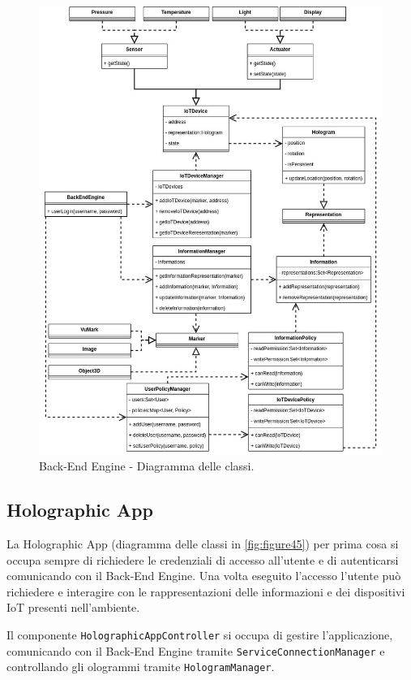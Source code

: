 \begin{figure}[H]
    \centering
    \includegraphics[width=\textwidth]{images/MR Service - Diagramma Classi.jpg}
    \caption{Back-End Engine - Diagramma delle classi.}
    \label{fig:figure44}
\end{figure}

\subsection{Holographic App}
La Holographic App (diagramma delle classi in \ref{fig:figure45}) per prima cosa si occupa sempre di richiedere le credenziali di accesso all'utente e di autenticarsi comunicando con il Back-End Engine.
Una volta eseguito l'accesso l'utente può richiedere e interagire con le rappresentazioni delle informazioni e dei dispositivi IoT presenti nell'ambiente.

Il componente \texttt{HolographicAppController} si occupa di gestire l'applicazione, comunicando con il Back-End Engine tramite \texttt{ServiceConnectionManager} e controllando gli ologrammi tramite \texttt{HologramManager}.

